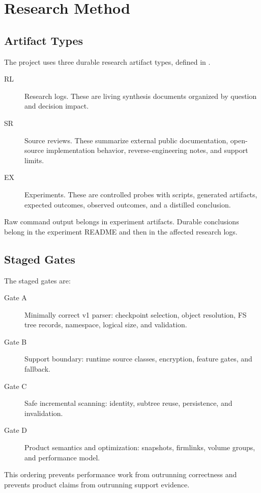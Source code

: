 \chapter{Research Method}

\section{Artifact Types}

The project uses three durable research artifact types, defined in
.

\begin{description}
  \item[RL] Research logs. These are living synthesis documents organized by
  question and decision impact.
  \item[SR] Source reviews. These summarize external public documentation,
  open-source implementation behavior, reverse-engineering notes, and support
  limits.
  \item[EX] Experiments. These are controlled probes with scripts, generated
  artifacts, expected outcomes, observed outcomes, and a distilled conclusion.
\end{description}

Raw command output belongs in experiment artifacts. Durable conclusions belong
in the experiment README and then in the affected research logs.

\section{Staged Gates}

The staged gates are:

\begin{description}
  \item[Gate A] Minimally correct v1 parser: checkpoint selection, object
  resolution, FS tree records, namespace, logical size, and validation.
  \item[Gate B] Support boundary: runtime source classes, encryption, feature
  gates, and fallback.
  \item[Gate C] Safe incremental scanning: identity, subtree reuse, persistence,
  and invalidation.
  \item[Gate D] Product semantics and optimization: snapshots, firmlinks,
  volume groups, and performance model.
\end{description}

This ordering prevents performance work from outrunning correctness and prevents
product claims from outrunning support evidence.

